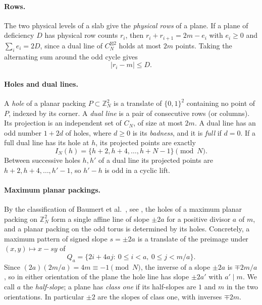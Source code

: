 \documentclass[11pt,colorlinks]{charlie}
\newcommand{\ZN}{\mathbb{Z}_N}
\newcommand{\spow}{\boxtimes}
\begin{document}
\paragraph{Rows.}
The two physical levels of a slab give the \emph{physical rows} of a plane. If a plane of deficiency $D$ has physical row counts $r_i$, then $r_i+r_{i+1}=2m-e_i$ with $e_i\ge0$ and $\sum_ie_i=2D$, since a dual line of $C_N^{\spow2}$ holds at most $2m$ points. Taking the alternating sum around the odd cycle gives
\begin{equation}\label{eq:rows}
 |r_i-m|\le D .
\end{equation}

\paragraph{Holes and dual lines.}
A \emph{hole} of a planar packing $P\subset\ZN^2$ is a translate of $\{0,1\}^2$ containing no point of $P$, indexed by its corner. A \emph{dual line} is a pair of consecutive rows (or columns). Its projection is an independent set of $C_N$, of size at most $2m$. A dual line has an odd number $1+2d$ of holes, where $d\ge0$ is its \emph{badness}, and it is \emph{full} if $d=0$. If a full dual line has its hole at $h$, its projected points are exactly
\[
 I_N(h)=\{h+2,h+4,\ldots,h+N-1\}\pmod N .
\]
Between successive holes $h,h'$ of a dual line its projected points are $h+2,h+4,\ldots,h'-1$, so $h'-h$ is odd in a cyclic lift.

\paragraph{Maximum planar packings.}
By the classification of Baumert et al.\ \cite{BBC}, see \cite[Section~2.5]{BHN}, the holes of a maximum planar packing on $\ZN^2$ form a single affine line of slope $\pm2a$ for a positive divisor $a$ of $m$, and a planar packing on the odd torus is determined by its holes. Concretely, a maximum pattern of signed slope $s=\pm2a$ is a translate of the preimage under $(x,y)\mapsto x-sy$ of
\[
 Q_a=\{2i+4aj:\ 0\le i<a,\ 0\le j<m/a\}.
\]
Since $(2a)(2m/a)=4m\equiv-1\pmod N$, the inverse of a slope $\pm2a$ is $\mp2m/a$, so in either orientation of the plane the hole line has slope $\pm2a'$ with $a'\mid m$. We call $a$ the \emph{half-slope}; a plane has \emph{class one} if its half-slopes are $1$ and $m$ in the two orientations. In particular $\pm2$ are the slopes of class one, with inverses $\mp2m$.
\end{document}
